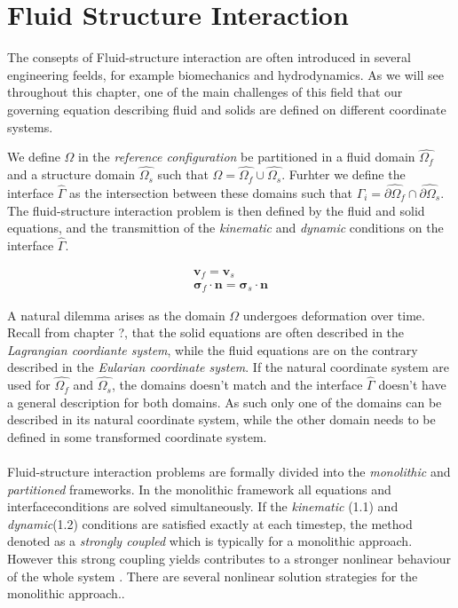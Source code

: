 \chapter{Fluid Structure Interaction}


The consepts of Fluid-structure interaction are often introduced in several engineering feelds, for example biomechanics and hydrodynamics. As we will see throughout this chapter, one of the main challenges of this field that our governing equation describing fluid and solids are defined on different coordinate systems. 

We define $\Omega$ in the \textit{reference configuration} be partitioned in a fluid domain $\hat{\Omega_f}$ and a structure domain $\hat{\Omega_s}$ such that
$\Omega = \hat{\Omega_f} \cup \hat{\Omega_s}$. Furhter we define the interface $\hat{\Gamma}$ as the intersection between these domains such that $\Gamma_i = \hat{\partial \Omega_f} \cap \hat{\partial \Omega_s}$. 
The fluid-structure interaction problem is then defined by the fluid and solid equations, and the transmittion of the \textit{kinematic} and \textit{dynamic} conditions on the interface $\hat{\Gamma}$. 

\begin{align}
\mathbf{v}_f = \mathbf{v}_s \\
\mathbf{\sigma}_f \cdot \mathbf{n} = \mathbf{\sigma}_s \cdot \mathbf{n}
\end{align}

 A natural dilemma arises as the domain $\Omega$ undergoes deformation over time. Recall from chapter ?, that the solid equations are often described in the \textit{Lagrangian coordiante system}, while the fluid equations are on the contrary described in the \textit{Eularian coordinate system}. If the natural coordinate system are used for $\hat{\Omega_f}$ and $\hat{\Omega_s}$, the domains doesn't match and the interface $\hat{\Gamma}$ doesn't have a general description for both domains. As such only one of the domains can be described in its natural coordinate system, while the other domain needs to be defined in some transformed coordinate system. \\ \\

Fluid-structure interaction problems are formally divided into the \textit{monolithic} and \textit{partitioned} frameworks.  In the monolithic framework all equations and interfaceconditions are solved simultaneously. If the \textit{kinematic} (1.1) and \textit{dynamic}(1.2) conditions are satisfied exactly at each timestep, the method denoted as a \textit{strongly coupled} which is typically for a monolithic approach. However this strong coupling yields contributes to a stronger nonlinear behaviour of the whole system \cite{Wick}. There are several nonlinear solution strategies for the monolithic approach..

